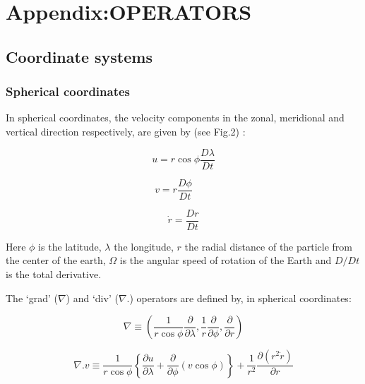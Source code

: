 \documentclass[12pt]{book}
\begin{document}

\section{Appendix:OPERATORS}

\subsection{Coordinate systems}

\subsubsection{Spherical coordinates}

In spherical coordinates, the velocity components in the zonal, meridional
and vertical direction respectively, are given by (see Fig.2) :

\begin{equation*}
u=r\cos \phi \frac{D\lambda }{Dt}
\end{equation*}

\begin{equation*}
v=r\frac{D\phi }{Dt}\qquad
\end{equation*}
$\qquad \qquad \qquad \qquad $

\begin{equation*}
\dot{r}=\frac{Dr}{Dt}
\end{equation*}

Here $\phi $ is the latitude, $\lambda $ the longitude, $r$ the radial
distance of the particle from the center of the earth, $\Omega $ is the
angular speed of rotation of the Earth and $D/Dt$ is the total derivative.

The `grad' ($\nabla $) and `div' ($\nabla $.) operators are defined by, in
spherical coordinates:

\begin{equation*}
\nabla \equiv \left( \frac{1}{r\cos \phi }\frac{\partial }{\partial \lambda }
,\frac{1}{r}\frac{\partial }{\partial \phi },\frac{\partial }{\partial r}
\right)
\end{equation*}

\begin{equation*}
\nabla .v\equiv \frac{1}{r\cos \phi }\left\{ \frac{\partial u}{\partial
\lambda }+\frac{\partial }{\partial \phi }\left( v\cos \phi \right) \right\}
+\frac{1}{r^{2}}\frac{\partial \left( r^{2}\dot{r}\right) }{\partial r}
\end{equation*}
\end{document}
